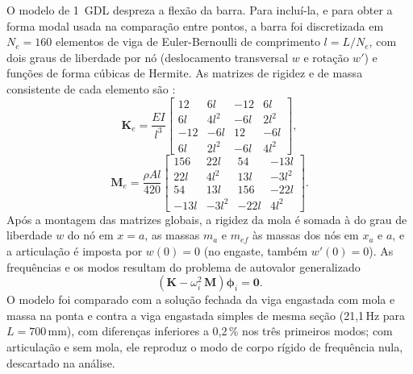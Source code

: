 \documentclass[a4paper,10pt,twocolumn]{article}
\begin{document}
O modelo de 1~GDL despreza a flexão da barra. Para incluí-la, e para obter a forma modal usada na comparação entre pontos, a barra foi discretizada em $N_e = 160$ elementos de viga de Euler-Bernoulli de comprimento $l = L/N_e$, com dois graus de liberdade por nó (deslocamento transversal $w$ e rotação $w'$) e funções de forma cúbicas de Hermite. As matrizes de rigidez e de massa consistente de cada elemento são \cite{Petyt2010}:
\begin{equation}
    \mathbf{K}_e = \frac{EI}{l^3}
    \begin{bmatrix}
        12 & 6l & -12 & 6l \\
        6l & 4l^2 & -6l & 2l^2 \\
        -12 & -6l & 12 & -6l \\
        6l & 2l^2 & -6l & 4l^2
    \end{bmatrix},
    \label{eq:Ke}
\end{equation}
\begin{equation}
    \mathbf{M}_e = \frac{\rho A l}{420}
    \begin{bmatrix}
        156 & 22l & 54 & -13l \\
        22l & 4l^2 & 13l & -3l^2 \\
        54 & 13l & 156 & -22l \\
        -13l & -3l^2 & -22l & 4l^2
    \end{bmatrix}.
    \label{eq:Me}
\end{equation}
Após a montagem das matrizes globais, a rigidez da mola é somada à do grau de liberdade $w$ do nó em $x = a$, as massas $m_a$ e $m_{ef}$ às massas dos nós em $x_a$ e $a$, e a articulação é imposta por $w(0) = 0$ (no engaste, também $w'(0) = 0$). As frequências e os modos resultam do problema de autovalor generalizado
\begin{equation}
    \left(\mathbf{K} - \omega_i^2\,\mathbf{M}\right)\boldsymbol{\phi}_i = \mathbf{0}.
    \label{eq:autovalor}
\end{equation}
O modelo foi comparado com a solução fechada da viga engastada com mola e massa na ponta e contra a viga engastada simples de mesma seção (21,1\,Hz para $L = 700$\,mm), com diferenças inferiores a 0,2\,\% nos três primeiros modos; com articulação e sem mola, ele reproduz o modo de corpo rígido de frequência nula, descartado na análise.
\end{document}
